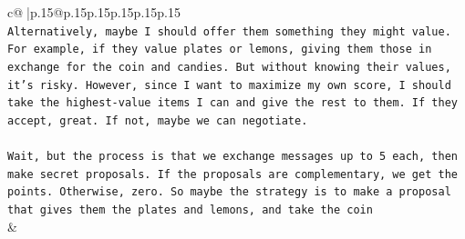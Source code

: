 \documentclass{article}
\begin{document}
{\begin{supertabular}{c@{$\;$}|p{.15\linewidth}@{}p{.15\linewidth}p{.15\linewidth}p{.15\linewidth}p{.15\linewidth}p{.15\linewidth}}
{{{\\ 
\texttt{Alternatively, maybe I should offer them something they might value. For example, if they value plates or lemons, giving them those in exchange for the coin and candies. But without knowing their values, it's risky. However, since I want to maximize my own score, I should take the highest{-}value items I can and give the rest to them. If they accept, great. If not, maybe we can negotiate.} \\
\\ 
\texttt{Wait, but the process is that we exchange messages up to 5 each, then make secret proposals. If the proposals are complementary, we get the points. Otherwise, zero. So maybe the strategy is to make a proposal that gives them the plates and lemons, and take the coin} \\
            }
        }
    }
    & \\ \\


\end{supertabular}}
\end{document}
